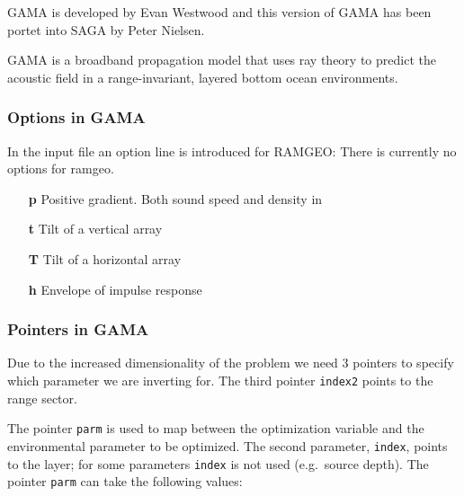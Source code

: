 \documentclass{saclantc}
\begin{document}
{\sf GAMA} \cite{westwood:asa87,westwood:asa87b}   is developed by
Evan Westwood and this version of GAMA has been portet into SAGA by
Peter Nielsen.

{\sf GAMA} is a broadband propagation model that uses ray theory to
predict the acoustic field in a range-invariant, layered bottom ocean
environments. 

\subsubsection{Options in GAMA}
In the input file an option line is introduced for {\sf RAMGEO}:
There is currently no options for ramgeo.
\begin{itemize}
 \item[\bf p]     Positive gradient. Both sound speed and density in
 \item[\bf t]     Tilt of a vertical array
 \item[\bf T]     Tilt of a horizontal array
 \item[\bf h]     Envelope of impulse response
\end{itemize}


\subsubsection{Pointers in GAMA}
\label{se:gamaopoint}
Due to the increased dimensionality of the problem we need 3 pointers to specify
which parameter we are inverting for. The third pointer {\tt index2} points to the range sector.

The pointer {\tt parm} is used to map between the optimization variable and the
environmental parameter to be optimized. The second parameter, {\tt index}, points to the
layer; for some parameters {\tt index} is not used (e.g.\ source depth).  
The pointer {\tt parm} can take the following values:
\end{document}
